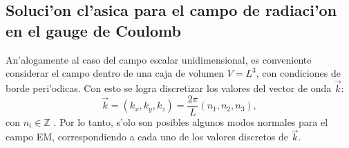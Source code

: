 \subsection{Soluci'on cl'asica para el campo de radiaci'on en el gauge de
Coulomb}

An'alogamente al caso del campo escalar unidimensional, es conveniente
considerar el campo dentro de una caja de volumen $V=L^{3}$, con condiciones de
borde peri'odicas. Con esto se logra discretizar los valores del vector de onda
$\vec{k}$:
\begin{equation}
\vec{k}=\left( k_{x},k_{y},k_{z}\right) =\frac{2\pi}{L}\left(
n_{1},n_{2},n_{3}\right), \label{kperm}
\end{equation}
con $n_{i}\in\mathbb{Z}$ . Por lo tanto, s'olo son posibles algunos modos
normales para el campo EM, correspondiendo a cada uno de los valores discretos
de $\vec{k}.$

